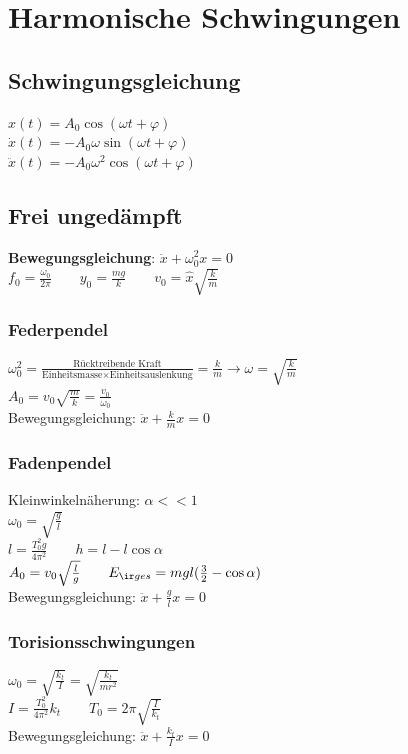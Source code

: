 \documentclass[german]{latex4ei/latex4ei_sheet}
\begin{document}
\section{Harmonische Schwingungen}
\begin{sectionbox}
\subsection{Schwingungsgleichung}
$x(t)=A_0\cos(\omega t + \varphi)$ \\
$\dot{x}(t)=-A_0\omega\sin(\omega t + \varphi)$\\
$\ddot{x}(t)=-A_0\omega^2\cos(\omega t + \varphi)$
\end{sectionbox}

\begin{sectionbox}
\subsection{Frei ungedämpft}
\textbf{Bewegungsgleichung}: $\ddot{x}+\omega_0^2x=0$\\
$f_0=\frac{\omega_0}{2\pi} \qquad y_0=\frac{mg}{k} \qquad v_0 = \hat{x}\sqrt{\frac{k}{m}}$
\subsubsection{Federpendel}
$\omega_0^2=\frac{\text{Rücktreibende Kraft}}{\text{Einheitsmasse} \times \text{Einheitsauslenkung}}=\frac{k}{m} \rightarrow \omega = \sqrt{\frac{k}{m}}$\\
$A_0=v_0\sqrt{\frac{m}{k}}=\frac{v_0}{\omega_0}$\\
Bewegungsgleichung: $\ddot{x}+\frac{k}{m}x=0$
\subsubsection{Fadenpendel}
Kleinwinkelnäherung: $\alpha << 1$\\
$\omega_0=\sqrt{\frac{g}{l}}$\\
$l=\frac{T_0^2g}{4\pi^2} \qquad h=l-l\cos \alpha$\\
$A_0 = v_0 \sqrt{\frac{l}{g}} \qquad E_{\ir ges} = mgl(\frac{3}{2}-\cos \alpha)$\\
Bewegungsgleichung: $\ddot{x}+\frac{g}{l}x=0$
\subsubsection{Torisionsschwingungen}
$\omega_0 = \sqrt{\frac{k_t}{I}}=\sqrt{\frac{k_t}{mr^2}}$\\
$I=\frac{T_0^2}{4\pi^2}k_t \qquad T_0=2\pi \sqrt{\frac{I}{k_t}}$\\
Bewegungsgleichung: $\ddot{x}+\frac{k_t}{I}x=0$
\end{sectionbox}
\end{document}
